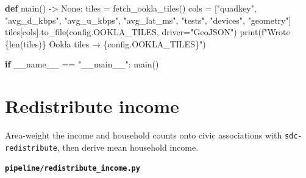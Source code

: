 \documentclass[
  letterpaper,
  DIV=11,
  numbers=noendperiod]{scrreprt}
\newenvironment{Shaded}{\begin{snugshade}}{\end{snugshade}}
\newcommand{\BuiltInTok}[1]{\textcolor[rgb]{0.00,0.23,0.31}{#1}}
\newcommand{\ControlFlowTok}[1]{\textcolor[rgb]{0.00,0.23,0.31}{\textbf{#1}}}
\newcommand{\KeywordTok}[1]{\textcolor[rgb]{0.00,0.23,0.31}{\textbf{#1}}}
\newcommand{\NormalTok}[1]{\textcolor[rgb]{0.00,0.23,0.31}{#1}}
\newcommand{\OperatorTok}[1]{\textcolor[rgb]{0.37,0.37,0.37}{#1}}
\newcommand{\SpecialCharTok}[1]{\textcolor[rgb]{0.37,0.37,0.37}{#1}}
\newcommand{\SpecialStringTok}[1]{\textcolor[rgb]{0.13,0.47,0.30}{#1}}
\newcommand{\StringTok}[1]{\textcolor[rgb]{0.13,0.47,0.30}{#1}}
\newcommand{\VariableTok}[1]{\textcolor[rgb]{0.07,0.07,0.07}{#1}}
\begin{document}
\begin{Shaded}
\begin{Highlighting}[]
\KeywordTok{def}\NormalTok{ main() }\OperatorTok{{-}\textgreater{}} \VariableTok{None}\NormalTok{:}
\NormalTok{    tiles }\OperatorTok{=}\NormalTok{ fetch\_ookla\_tiles()}
\NormalTok{    cols }\OperatorTok{=}\NormalTok{ [}\StringTok{"quadkey"}\NormalTok{, }\StringTok{"avg\_d\_kbps"}\NormalTok{, }\StringTok{"avg\_u\_kbps"}\NormalTok{, }\StringTok{"avg\_lat\_ms"}\NormalTok{, }\StringTok{"tests"}\NormalTok{, }\StringTok{"devices"}\NormalTok{, }\StringTok{"geometry"}\NormalTok{]}
\NormalTok{    tiles[cols].to\_file(config.OOKLA\_TILES, driver}\OperatorTok{=}\StringTok{"GeoJSON"}\NormalTok{)}
    \BuiltInTok{print}\NormalTok{(}\SpecialStringTok{f"Wrote }\SpecialCharTok{\{}\BuiltInTok{len}\NormalTok{(tiles)}\SpecialCharTok{\}}\SpecialStringTok{ Ookla tiles → }\SpecialCharTok{\{}\NormalTok{config}\SpecialCharTok{.}\NormalTok{OOKLA\_TILES}\SpecialCharTok{\}}\SpecialStringTok{"}\NormalTok{)}


\ControlFlowTok{if} \VariableTok{\_\_name\_\_} \OperatorTok{==} \StringTok{"\_\_main\_\_"}\NormalTok{:}
\NormalTok{    main()}
\end{Highlighting}
\end{Shaded}

\section{Redistribute income}\label{redistribute-income}

Area-weight the income and household counts onto civic associations with
\texttt{sdc-redistribute}, then derive mean household income.

\textbf{\texttt{pipeline/redistribute\_income.py}}
\end{document}

